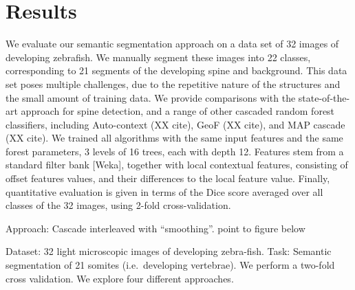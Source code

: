 \documentclass[10pt,twocolumn,letterpaper]{article}
\begin{document}
\section{Results}

We evaluate our semantic segmentation approach on a data set of 32 images of developing zebrafish.  We manually segment these images into 22 classes, corresponding to 21 segments of the developing spine and background.  This data set poses multiple challenges, due to the repetitive nature of the structures and the small amount of training data.  We provide comparisons with the state-of-the-art approach for spine detection, and a range of other cascaded random forest classifiers, including Auto-context (XX cite), GeoF (XX cite), and MAP cascade (XX cite).  We trained all algorithms with the same input features and the same forest parameters, 3 levels of 16 trees, each with depth 12.  Features stem from a standard filter bank [Weka], together with local contextual features, consisting of offset features values, and their differences to the local feature value.  Finally, quantitative evaluation is given in terms of the Dice score averaged over all classes of the 32 images, using 2-fold cross-validation.

Approach: Cascade interleaved with "`smoothing"'. 
point to figure below




Dataset: 32 light microscopic images of developing zebra-fish. Task: Semantic segmentation of 21 somites (i.e.\ developing vertebrae). 
%
We perform a two-fold cross validation. We explore four different approaches. 
\end{document}
